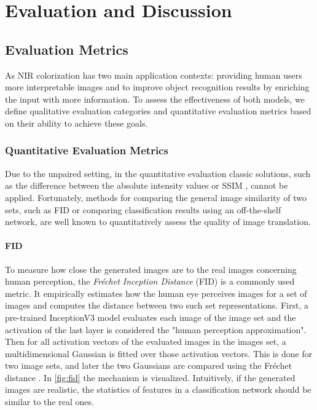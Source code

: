\chapter{Evaluation and Discussion}
\label{chap:evaluation-and-discussion}

\section{Evaluation Metrics}

As NIR colorization has two main application contexts: providing human users more interpretable images and to improve object recognition results by enriching the input with more information.
To assess the effectiveness of both models, we define qualitative evaluation categories and quantitative evaluation metrics based on their ability to achieve these goals.

\subsection{Quantitative Evaluation Metrics}
Due to the unpaired setting, in the quantitative evaluation classic solutions, such as the difference between the absolute intensity values or SSIM \parencite{ssim}, cannot be applied. Fortunately, methods for comparing the general image similarity of two sets, such as FID \parencite{ttur} or
comparing classification results using an off-the-shelf network, are well known to quantitatively assess the quality of image translation.

\subsubsection*{FID}
\label{sec:fid}
To measure how close the generated images are to the real images concerning human perception, the \textit{Fréchet Inception Distance} (FID) \parencite{ttur} is a commonly used metric.
It empirically estimates how the human eye perceives images for a set of images and computes the distance between two such set representations.
First, a pre-trained InceptionV3 model evaluates each image of the image set and the activation of the last layer is considered the "human perception approximation".
Then for all activation vectors of the evaluated images in the images set, a multidimensional Gaussian is fitted over those activation vectors.
This is done for two image sets, and later the two Gaussians are compared using the Fréchet distance \parencite{ttur}.
In \autoref{fig:fid} the mechanism is visualized.
Intuitively, if the generated images are realistic, the statistics of features in a classification network should be similar to the real ones.

